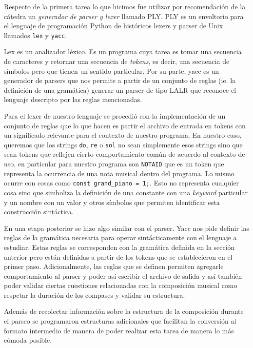 Respecto de la primera tarea lo que hicimos fue utilizar por recomendación de la cátedra un \emph{generador de parser y lexer} llamado
PLY. PLY es un envoltorio para el lenguaje de programación Python de históricos lexers y parser de Unix llamados \texttt{lex} y \texttt{yacc}.

Lex es un analizador léxico. Es un programa cuya tarea es tomar una secuencia de caracteres y retornar una secuencia de \emph{tokens}, es decir,
una secuencia de símbolos pero que tienen un sentido particular. Por su parte, yacc es un generador de parsers que nos permite a partir de un
conjunto de reglas (ie. la definición de una gramática) generar un parser de tipo LALR que reconoce el lenguaje descripto por las reglas mencionadas.

Para el lexer de nuestro lenguaje se procedió con la implementación de un conjunto de reglas que lo que hacen es partir el archivo de entrada
en tokens con un significado relevante para el contexto de nuestro programa. En nuestro caso, queremos que los strings \texttt{do}, \texttt{re} o
\texttt{sol} no sean simplemente esos strings sino que sean tokens que reflejen cierto comportamiento común de acuerdo al contexto de uso, en particular
para nuestro programa son \texttt{NOTAID} que es un token que representa la ocurrencia de una nota musical dentro del programa. Lo mismo ocurre
con cosas como \texttt{const grand\_piano = 1;}. Esto no representa cualquier cosa sino que simboliza la definición de una constante con una
\emph{keyword} particular y un nombre con un valor y otros símbolos que permiten identificar esta construcción sintáctica.

En una etapa posterior se hizo algo similar con el parser. Yacc nos pide definir las reglas de la gramática necesaria para operar
sintácticamente con el lenguaje a estudiar. Estas reglas se corresponden con la gramática definida en la sección anterior pero están
definidas a partir de los tokens que se establecieron en el primer paso. Adicionalmente, las reglas que se definen permiten agregarle comportamiento 
al parser y poder así escribir el archivo de salida y así también poder validar ciertas cuestiones relacionadas con la composición musical
como respetar la duración de los compases y validar su estructura.

Además de recolectar información sobre la estructura de la composición durante el parseo se programaron estructuras adicionales que facilitan la 
conversión al formato intermedio de manera de poder realizar esta tarea de manera lo más cómoda posible.

